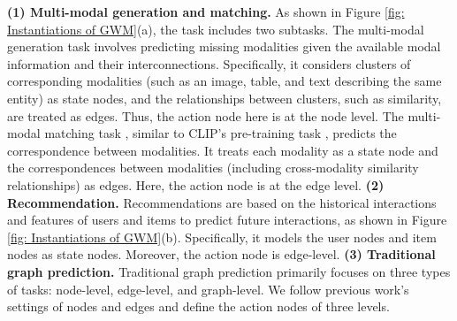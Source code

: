 \textbf{(1) Multi-modal generation and matching.} As shown in Figure \ref{fig: Instantiations of GWM}(a), the task includes two subtasks. The multi-modal generation task \citep{rombach2022high,zhang2023adding} involves predicting missing modalities given the available modal information and their interconnections. Specifically, it considers clusters of corresponding modalities (such as an image, table, and text describing the same entity) as state nodes, and the relationships between clusters, such as similarity, are treated as edges. Thus, the action node here is at the node level. The multi-modal matching task \citep{rombach2022high}, similar to CLIP's pre-training task \citep{radford2021learning}, predicts the correspondence between modalities. It treats each modality as a state node and the correspondences between modalities (including cross-modality similarity relationships) \citep{jin2024instructg2i} as edges. Here, the action node is at the edge level. \textbf{(2) Recommendation.} Recommendations \citep{ni2023content,isinkaye2015recommendation,ko2022survey} are based on the historical interactions and features of users and items to predict future interactions, as shown in Figure \ref{fig: Instantiations of GWM}(b). Specifically, it models the user nodes and item nodes as state nodes. Moreover, the action node is edge-level.
\textbf{(3) Traditional graph prediction.} Traditional graph prediction \citep{kipf2016semi,velivckovic2017graph,hamilton2017inductive} primarily focuses on three types of tasks: node-level, edge-level, and graph-level. We follow previous work's settings of nodes and edges and define the action nodes of three levels.



